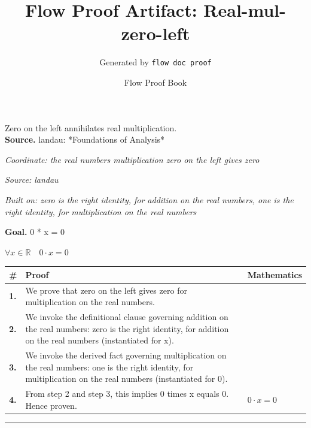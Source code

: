 \documentclass[11pt]{article}
\title{Flow Proof Artifact: Real-mul-zero-left}
\author{Generated by \texttt{flow doc proof}}
\date{Flow Proof Book}
\theoremstyle{definition}
\begin{document}
\maketitle
Zero on the left annihilates real multiplication.\\[0.5em]
\textbf{Source.} landau: *Foundations of Analysis*\\[0.5em]
\bigskip
{}\par
\smallskip\noindent\textit{Coordinate: the real numbers \cdot multiplication \cdot zero on the left gives zero}\par
\smallskip\noindent\textit{Source: landau}\par
\smallskip\noindent\textit{Built on: zero is the right identity, for addition on the real numbers, one is the right identity, for multiplication on the real numbers}\par
\medskip
\noindent\textbf{Goal.} 0 * x = 0\par
\noindent$\displaystyle \forall x \in \mathbb{R}\quad 0 \cdot x = 0$\par
\medskip
\noindent
\begin{tabular}{@{} >{\raggedright\arraybackslash}p{} >{\raggedright\arraybackslash}p{} >{\raggedleft\arraybackslash}p{} @{}}
\textbf{\#} & \textbf{Proof} & \textbf{Mathematics} \\
\midrule
\textbf{1.} & We prove that zero on the left gives zero for multiplication on the real numbers. & \\[0.45em]
\textbf{2.} & We invoke the definitional clause governing addition on the real numbers: zero is the right identity, for addition on the real numbers (instantiated for x). & \\[0.45em]
\textbf{3.} & We invoke the derived fact governing multiplication on the real numbers: one is the right identity, for multiplication on the real numbers (instantiated for 0). & \\[0.45em]
\textbf{4.} & From step 2 and step 3, this implies 0 times x equals 0. Hence proven. & $\displaystyle 0 \cdot x = 0$ \\[0.45em]
\bottomrule
\end{tabular}
\label{thm:Real-multiplication-zero_on_the_left_gives_zero}
\par\medskip\hrule
\end{document}
